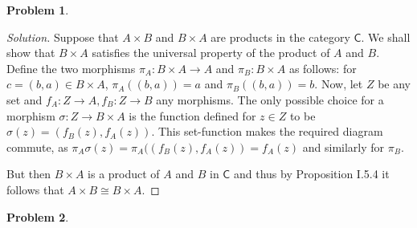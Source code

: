 \documentclass{article}
\theoremstyle{definition}
\newtheorem{problem-internal}{Problem}[subsection]
\newenvironment{problem}{
	\medskip
	\begin{problem-internal}
	}{
\end{problem-internal}
}
\newenvironment{solution}{
	\begin{proof}[Solution]
		\vspace{-8px}
		\setlength{\parskip}{4px}
		\setlength{\parindent}{0px}
	}{
\end{proof}
}
\newcommand{\C}{\mathsf{C}}
\begin{document}
\begin{problem}
\end{problem}

\begin{solution}
	Suppose that $A \times B$ and $B \times A$ are products in the category $\C$. We shall show that $B \times A$ satisfies the universal property of the product of $A$ and $B$. Define the two morphisms $\pi_A: B \times A \to A$ and $\pi_B: B \times A$ as follows: for $c = (b, a) \in B \times A$, $\pi_A((b,a)) = a$ and $\pi_B((b,a)) = b$. Now, let $Z$ be any set and $f_A: Z \to A, f_B: Z \to B$ any morphisms. The only possible choice for a morphism $\sigma : Z \to B \times A$ is the function defined for $z \in Z$ to be $\sigma(z) = (f_B(z), f_A(z))$. This set-function makes the required diagram commute, as $\pi_A\sigma(z)=\pi_A((f_B(z), f_A(z))=f_A(z)$ and similarly for $\pi_B$.
	
	But then $B \times A$ is a product of $A$ and $B$ in $\C$ and thus by Proposition I.5.4 it follows that $A \times B \cong B \times A$.
\end{solution}

\begin{problem}
\end{problem}
\end{document}
